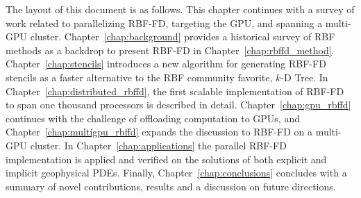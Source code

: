 \documentclass[11pt]{report}
\begin{document}


%
%
%
%



The layout of this document is as follows. This chapter continues with a survey of work related to parallelizing RBF-FD, targeting the GPU, and spanning a multi-GPU cluster. Chapter~\ref{chap:background} provides a historical survey of RBF methods as a backdrop to present RBF-FD in Chapter~\ref{chap:rbffd_method}. Chapter~\ref{chap:stencils} introduces a new algorithm for generating RBF-FD stencils as a faster alternative to the RBF community favorite, $k$-D Tree. In Chapter~\ref{chap:distributed_rbffd}, the first scalable implementation of RBF-FD to span one thousand processors is described in detail. Chapter~\ref{chap:gpu_rbffd} continues with the challenge of offloading computation to GPUs, and Chapter~\ref{chap:multigpu_rbffd} expands the discussion to RBF-FD on a multi-GPU cluster. In Chapter~\ref{chap:applications} the parallel RBF-FD implementation is applied and verified on the solutions of both explicit and implicit geophysical PDEs. Finally, Chapter~\ref{chap:conclusions} concludes with a summary of novel contributions, results and a discussion on future directions.
\end{document}
